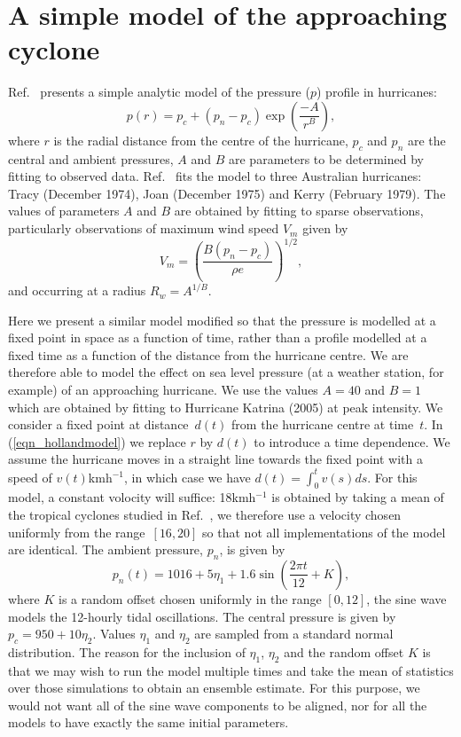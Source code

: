 \documentclass[%
aip,
amsmath,amssymb,
reprint,%
]{revtex4-1}
\begin{document}
\section{A simple model of the approaching cyclone}
\label{sec:Model}

Ref.~ presents a simple analytic model of the pressure ($p$) profile in hurricanes:
\begin{equation}
p(r) = p_c + (p_n-p_c)\exp\left( \frac{-A}{r^B} \right),
\label{eqn_hollandmodel}
\end{equation} 
where $r$ is the radial distance from the centre of the hurricane, $p_c$ and $p_n$ are the central and ambient pressures, $A$ and $B$ are parameters to be determined by fitting to observed data. Ref.~ fits the model to three Australian hurricanes: Tracy (December 1974), Joan (December 1975) and Kerry (February 1979). The values of parameters $A$ and $B$ are obtained by fitting to sparse observations, particularly observations of maximum wind speed $V_m$ given by
\begin{equation}
V_m = \left(\frac{B(p_n-p_c)}{\rho e}\right)^{1/2},
\end{equation} 
and occurring at a radius $R_w = A^{1/B}$. 

Here we present a similar model modified so that the pressure is modelled at a fixed point in space as a function of time, rather than a profile modelled at a fixed time as a function of the distance from the hurricane centre. We are therefore able to model the effect on sea level pressure (at a weather station, for example) of an approaching hurricane. 
We use the values $A=40$ and $B=1$ which are obtained by fitting to Hurricane Katrina (2005) at peak intensity. We consider a fixed point at distance~$d(t)$ from the hurricane centre at time~$t$. In (\ref{eqn_hollandmodel}) we replace $r$ by $d(t)$ to introduce a time dependence. We assume the hurricane moves in a straight line towards the fixed point with a speed of $v(t)$kmh$^{-1}$, in which case we have $d(t) = \int_0^t v(s) ds$. For this model, a constant volocity will suffice: 18kmh$^{-1}$ is obtained by taking a mean of the tropical cyclones studied in Ref.~, we therefore use a velocity chosen uniformly from the range~$[16,20]$ so that not all implementations of the model are identical. The ambient pressure, $p_n$, is given by 
\begin{equation}
p_n(t) = 1016 + 5\eta_1 + 1.6\sin\left(\frac{2\pi t}{12} + K\right),
\label{eqn_ambientpressure}
\end{equation} 
where $K$ is a random offset chosen uniformly in the range $[0,12]$, the sine wave models the 12-hourly tidal oscillations. The central pressure is given by $p_c = 950+10\eta_2$. Values $\eta_1$ and $\eta_2$ are sampled from a standard normal distribution. The reason for the inclusion of $\eta_1$, $\eta_2$ and the random offset $K$ is that we may wish to run the model multiple times and take the mean of statistics over those simulations to obtain an ensemble estimate. For this purpose, we would not want all of the sine wave components to be aligned, nor for all the models to have exactly the same initial parameters.
\end{document}
